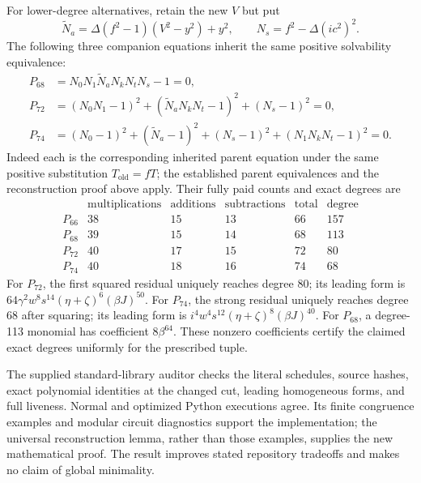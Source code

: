 For lower-degree alternatives, retain the new \(V\) but put
\[
 \widetilde N_a=\Delta(f^2-1)(V^2-y^2)+y^2,
 \qquad N_s=f^2-\Delta(ic^2)^2.
\]
The following three companion equations inherit the same positive
solvability equivalence:
\begin{align*}
 P_{68}&=N_0N_1\widetilde N_aN_kN_tN_s-1=0,\\
 P_{72}&=(N_0N_1-1)^2+(\widetilde N_aN_kN_t-1)^2+(N_s-1)^2=0,\\
 P_{74}&=(N_0-1)^2+(\widetilde N_a-1)^2+(N_s-1)^2
              +(N_1N_kN_t-1)^2=0.
\end{align*}
Indeed each is the corresponding inherited parent equation under the same
positive substitution \(T_{\mathrm{old}}=fT\); the established parent
equivalences and the reconstruction proof above apply.  Their fully paid
counts and exact degrees are
\[
\begin{array}{c|r|r|r|r|r}
 &\text{multiplications}&\text{additions}&\text{subtractions}
 &\text{total}&\text{degree}\\ \hline
 P_{66}&38&15&13&66&157\\
 P_{68}&39&15&14&68&113\\
 P_{72}&40&17&15&72&80\\
 P_{74}&40&18&16&74&68
\end{array}
\]
For \(P_{72}\), the first squared residual uniquely reaches degree 80;
its leading form is
\(64\gamma^2w^8s^{14}(\eta+\zeta)^6(\beta J)^{50}\).
For \(P_{74}\), the strong residual uniquely reaches degree 68 after
squaring; its leading form is
\(i^4w^4s^{12}(\eta+\zeta)^8(\beta J)^{40}\).
For \(P_{68}\), a degree-113 monomial has coefficient
\(8\beta^{64}\).  These nonzero coefficients certify the claimed exact
degrees uniformly for the prescribed tuple.

The supplied standard-library auditor checks the literal schedules, source
hashes, exact polynomial identities at the changed cut, leading homogeneous
forms, and full liveness.  Normal and optimized Python executions agree.
Its finite congruence examples and modular circuit diagnostics support the
implementation; the universal reconstruction lemma, rather than those
examples, supplies the new mathematical proof.  The result improves stated
repository tradeoffs and makes no claim of global minimality.

